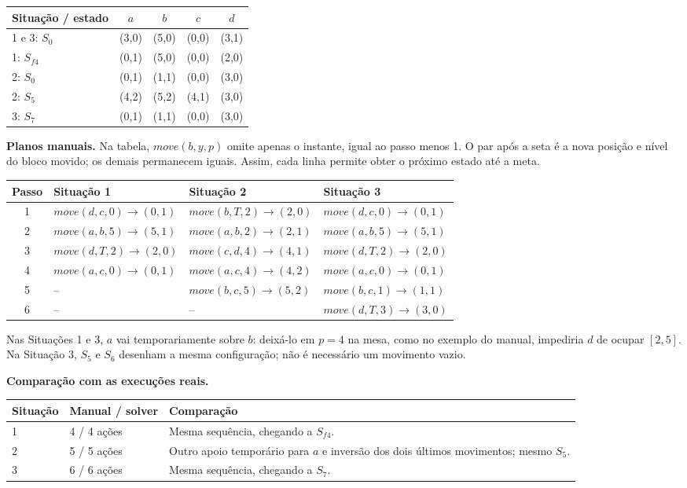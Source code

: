 \documentclass[11pt,a4paper]{article}
\begin{document}
\begin{center}
\begin{tabular}{lcccc}
\toprule Situação / estado & $a$ & $b$ & $c$ & $d$ \\ \midrule
1 e 3: $S_0$ & (3,0)&(5,0)&(0,0)&(3,1)\\
1: $S_{f4}$ & (0,1)&(5,0)&(0,0)&(2,0)\\
2: $S_0$ & (0,1)&(1,1)&(0,0)&(3,0)\\
2: $S_5$ & (4,2)&(5,2)&(4,1)&(3,0)\\
3: $S_7$ & (0,1)&(1,1)&(0,0)&(3,0)\\ \bottomrule
\end{tabular}
\end{center}

\textbf{Planos manuais.} Na tabela, $move(b,y,p)$ omite apenas o instante, igual ao passo menos 1. O par após a seta é a nova posição e nível do bloco movido; os demais permanecem iguais. Assim, cada linha permite obter o próximo estado até a meta.

\begin{center}\small
\begin{tabular}{clll}
\toprule Passo & Situação 1 & Situação 2 & Situação 3\\ \midrule
1 & $move(d,c,0)\to(0,1)$ & $move(b,T,2)\to(2,0)$ & $move(d,c,0)\to(0,1)$\\
2 & $move(a,b,5)\to(5,1)$ & $move(a,b,2)\to(2,1)$ & $move(a,b,5)\to(5,1)$\\
3 & $move(d,T,2)\to(2,0)$ & $move(c,d,4)\to(4,1)$ & $move(d,T,2)\to(2,0)$\\
4 & $move(a,c,0)\to(0,1)$ & $move(a,c,4)\to(4,2)$ & $move(a,c,0)\to(0,1)$\\
5 & -- & $move(b,c,5)\to(5,2)$ & $move(b,c,1)\to(1,1)$\\
6 & -- & -- & $move(d,T,3)\to(3,0)$\\ \bottomrule
\end{tabular}
\end{center}

Nas Situações 1 e 3, $a$ vai temporariamente sobre $b$: deixá-lo em $p=4$ na mesa, como no exemplo do manual, impediria $d$ de ocupar $[2,5]$. Na Situação 3, $S_5$ e $S_6$ desenham a mesma configuração; não é necessário um movimento vazio.

\textbf{Comparação com as execuções reais.}

\begin{tabularx}{\linewidth}{lL{2.2cm}Y}
\toprule Situação & Manual / solver & Comparação \\  & 4 / 4 ações & Mesma sequência, chegando a $S_{f4}$.\\
2 & 5 / 5 ações & Outro apoio temporário para $a$ e inversão dos dois últimos movimentos; mesmo $S_5$.\\
3 & 6 / 6 ações & Mesma sequência, chegando a $S_7$.\\ \bottomrule
\end{tabularx}
\end{document}
